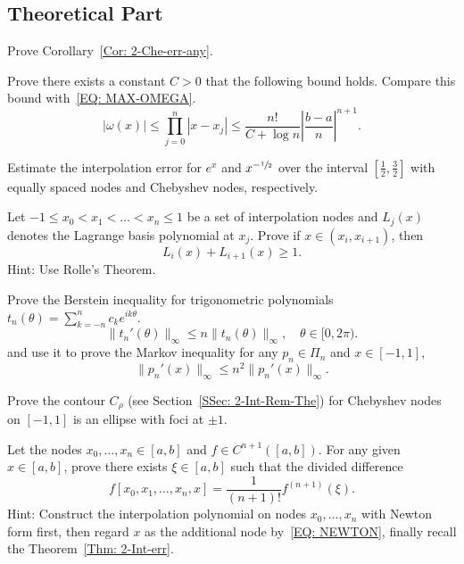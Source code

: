 \subsection{Theoretical Part}
\begin{problem}
    Prove Corollary~\ref{Cor: 2-Che-err-any}.
\end{problem}
\begin{problem}
    Prove there exists a constant $C > 0$ that the following bound holds. Compare this bound with~\eqref{EQ: MAX-OMEGA}.
    \begin{equation}
        |\omega(x)|\le \prod_{j=0}^n |x - x_j| \le \frac{n!}{C + \log n} \left|\frac{b-a}{n}\right|^{n+1}.
    \end{equation}
\end{problem}
\begin{problem}
\label{Prb: 2-Theo-2}
    Estimate the interpolation error for $e^x$ and $x^{-\sfrac{1}{2}}$ over the interval $[\frac{1}{2}, \frac{3}{2}]$ with equally spaced nodes and Chebyshev nodes, respectively.
\end{problem}
\begin{problem}
    Let $-1\le x_0 < x_1 <\dots < x_n \le 1$ be a set of interpolation nodes and $L_j(x)$ denotes the Lagrange basis polynomial at $x_j$. Prove if $x\in (x_i, x_{i+1})$, then 
    $$L_{i}(x) + L_{i+1}(x) \ge 1.$$
    Hint: Use Rolle's Theorem.
\end{problem}
\begin{problem}
    Prove the Berstein inequality  for trigonometric polynomials $t_n(\theta) = \sum_{k=-n}^n c_k e^{ik\theta}$.
    \begin{equation}\nonumber
        \|t_n'(\theta)\|_{\infty} \le n \|t_n(\theta)\|_{\infty},\quad \theta\in [0, 2\pi).
    \end{equation}
    and use it to prove the Markov inequality for any $p_n\in\Pi_n$ and $x\in [-1,1]$, 
    \begin{equation*}
        \|p_n'(x)\|_{\infty}\le n^2 \|p_n'(x)\|_{\infty}.
    \end{equation*}
\end{problem}
\begin{problem}
    Prove the contour $C_{\rho}$ (see Section~\ref{SSec: 2-Int-Rem-The}) for Chebyshev nodes on $[-1, 1]$ is an ellipse with foci at $\pm 1$. 
\end{problem}
\begin{problem}
\label{Prb: 2-Theo-4}
    Let the nodes $x_0, \dots, x_n\in[a,b]$ and $f\in C^{n+1}([a, b])$. For any given $x\in[a, b]$, prove there exists $\xi\in [a, b]$ such that the divided difference $$f[x_0, x_1, \dots, x_n, x] = \frac{1}{(n+1)!}f^{(n+1)}(\xi).$$
    Hint: {Construct the interpolation polynomial on nodes $x_0, \dots, x_n$ with Newton form first, then regard $x$ as the additional node by~\eqref{EQ: NEWTON}, finally recall the Theorem~\ref{Thm: 2-Int-err}.}
\end{problem}
